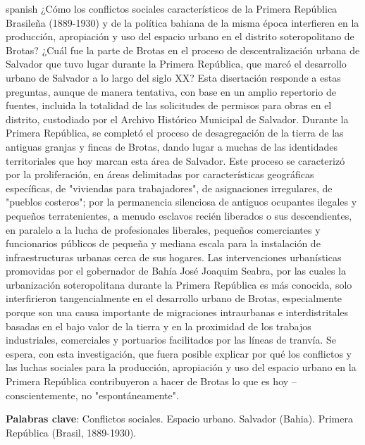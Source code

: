 % 

\begin{resumo}[Resumen]
 \begin{otherlanguage*}{spanish}
¿Cómo los conflictos sociales característicos de la Primera República Brasileña (1889-1930) y de la política bahiana de la misma época interfieren en la producción, apropiación y uso del espacio urbano en el distrito soteropolitano de Brotas? ¿Cuál fue la parte de Brotas en el proceso de descentralización urbana de Salvador que tuvo lugar durante la Primera República, que marcó el desarrollo urbano de Salvador a lo largo del siglo XX? Esta disertación responde a estas preguntas, aunque de manera tentativa, con base en un amplio repertorio de fuentes, incluida la totalidad de las solicitudes de permisos para obras en el distrito, custodiado por el Archivo Histórico Municipal de Salvador. Durante la Primera República, se completó el proceso de desagregación de la tierra de las antiguas granjas y fincas de Brotas, dando lugar a muchas de las identidades territoriales que hoy marcan esta área de Salvador. Este proceso se caracterizó por la proliferación, en áreas delimitadas por características geográficas específicas, de "viviendas para trabajadores", de asignaciones irregulares, de "pueblos costeros"; por la permanencia silenciosa de antiguos ocupantes ilegales y pequeños terratenientes, a menudo esclavos recién liberados o sus descendientes, en paralelo a la lucha de profesionales liberales, pequeños comerciantes y funcionarios públicos de pequeña y mediana escala para la instalación de infraestructuras urbanas cerca de sus hogares. Las intervenciones urbanísticas promovidas por el gobernador de Bahía José Joaquim Seabra, por las cuales la urbanización soteropolitana durante la Primera República es más conocida, solo interfirieron tangencialmente en el desarrollo urbano de Brotas, especialmente porque son una causa importante de migraciones intraurbanas e interdistritales basadas en el bajo valor de la tierra y en la proximidad de los trabajos industriales, comerciales y portuarios facilitados por las líneas de tranvía. Se espera, con esta investigación, que fuera posible explicar por qué los conflictos y las luchas sociales para la producción, apropiación y uso del espacio urbano en la Primera República contribuyeron a hacer de Brotas lo que es hoy -- conscientemente, no "espontáneamente".
  
   \textbf{Palabras clave}: Conflictos sociales. Espacio urbano. Salvador (Bahia). Primera República (Brasil, 1889-1930).
 \end{otherlanguage*}
\end{resumo}
